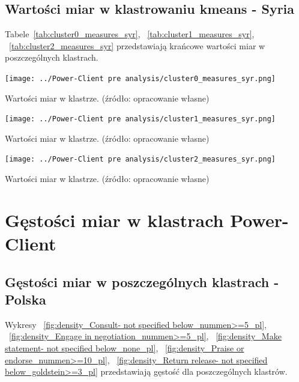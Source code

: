 \documentclass[11pt]{report}
\begin{document}
    \subsection{Wartości miar w klastrowaniu kmeans - Syria}\label{subsec:wartości-miar-w-klastrowaniu-kmeans---syria}

    Tabele~\ref{tab:cluster0_measures_syr},
    ~\ref{tab:cluster1_measures_syr},
    ~\ref{tab:cluster2_measures_syr}
    przedstawiają krańcowe wartości miar w poszczególnych klastrach.

    \begin{table}[!htp]
        \centering
        \texttt{[image: ../Power-Client pre analysis/cluster0\_measures\_syr.png]}
        \caption{Wartości miar w klastrze. (źródło: opracowanie własne)}
        \label{tab:cluster0_measures_syr}
    \end{table}
    \begin{table}[!htp]
        \centering
        \texttt{[image: ../Power-Client pre analysis/cluster1\_measures\_syr.png]}
        \caption{Wartości miar w klastrze. (źródło: opracowanie własne)}
        \label{tab:cluster1_measures_syr}
    \end{table}
    \begin{table}[!htp]
        \centering
        \texttt{[image: ../Power-Client pre analysis/cluster2\_measures\_syr.png]}
        \caption{Wartości miar w klastrze. (źródło: opracowanie własne)}
        \label{tab:cluster2_measures_syr}
    \end{table}


    \section{Gęstości miar w klastrach Power-Client}

    \subsection{Gęstości miar w poszczególnych klastrach - Polska}\label{subsec:gęstośc-miar-w-poszczególnych-klastrach---polska}
    Wykresy
    ~\ref{fig:density_Consult- not specified below_nummen>=5_pl},
    ~\ref{fig:density_Engage in negotiation_nummen>=5_pl},
    ~\ref{fig:density_Make statement- not specified below_none_pl},
    ~\ref{fig:density_Praise or endorse_nummen>=10_pl},
    ~\ref{fig:density_Return release- not specified below_goldstein>=3_pl}
    przedstawiają gęstość dla poszczególnych klastrów.
\end{document}
